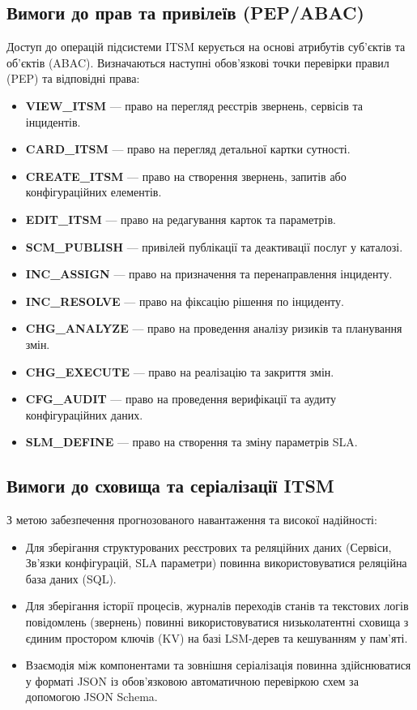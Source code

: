 \documentclass{article}
\begin{document}
\subsection{Вимоги до прав та привілеїв (PEP/ABAC)}
Доступ до операцій підсистеми ITSM керується на основі атрибутів суб'єктів та об'єктів (ABAC). Визначаються наступні обов'язкові точки перевірки правил (PEP) та відповідні права:
\begin{itemize}
    \item \textbf{VIEW\_ITSM} — право на перегляд реєстрів звернень, сервісів та інцидентів.
    \item \textbf{CARD\_ITSM} — право на перегляд детальної картки сутності.
    \item \textbf{CREATE\_ITSM} — право на створення звернень, запитів або конфігураційних елементів.
    \item \textbf{EDIT\_ITSM} — право на редагування карток та параметрів.
    \item \textbf{SCM\_PUBLISH} — привілей публікації та деактивації послуг у каталозі.
    \item \textbf{INC\_ASSIGN} — право на призначення та перенаправлення інциденту.
    \item \textbf{INC\_RESOLVE} — право на фіксацію рішення по інциденту.
    \item \textbf{CHG\_ANALYZE} — право на проведення аналізу ризиків та планування змін.
    \item \textbf{CHG\_EXECUTE} — право на реалізацію та закриття змін.
    \item \textbf{CFG\_AUDIT} — право на проведення верифікації та аудиту конфігураційних даних.
    \item \textbf{SLM\_DEFINE} — право на створення та зміну параметрів SLA.
\end{itemize}

\subsection{Вимоги до сховища та серіалізації ITSM}
З метою забезпечення прогнозованого навантаження та високої надійності:
\begin{itemize}
    \item Для зберігання структурованих реєстрових та реляційних даних (Сервіси, Зв'язки конфігурацій, SLA параметри) повинна використовуватися реляційна база даних (SQL).
    \item Для зберігання історії процесів, журналів переходів станів та текстових логів повідомлень (звернень) повинні використовуватися низьколатентні сховища з єдиним простором ключів (KV) на базі LSM-дерев та кешуванням у пам'яті.
    \item Взаємодія між компонентами та зовнішня серіалізація повинна здійснюватися у форматі JSON із обов'язковою автоматичною перевіркою схем за допомогою JSON Schema.
\end{itemize}
\end{document}
